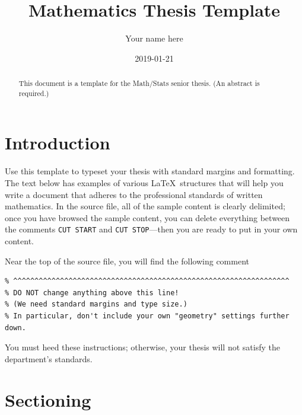 \documentclass[11pt]{amsart}
\title[Math Thesis Template]{Mathematics Thesis Template} %
\author{Your name here}
\date{2019-01-21} %
\theoremstyle{theorem} %
\theoremstyle{definition}                  %
\theoremstyle{example}                       %
\theoremstyle{remark}                       %
\numberwithin{equation}{section}
\begin{document}
\begin{abstract} %
This document is a template for the Math/Stats senior thesis. (An abstract is required.)
\end{abstract}

\maketitle %


\tableofcontents %

\section{Introduction}

Use this template to typeset your thesis with standard margins and formatting. The text below has examples of various \LaTeX\ structures that will help you write a 
document that adheres to the professional standards of written mathematics. 
In the source file, all of the sample content is clearly delimited; once you have browsed the sample content, you can delete everything between the comments \texttt{CUT START} and \texttt{CUT STOP}---then you are ready to put in your own content.

Near the top of the source file, you will find the following comment

\smallskip
\begin{verbatim}
% ^^^^^^^^^^^^^^^^^^^^^^^^^^^^^^^^^^^^^^^^^^^^^^^^^^^^^^^^^^^^^^^^^
% DO NOT change anything above this line! 
% (We need standard margins and type size.)
% In particular, don't include your own "geometry" settings further down.
\end{verbatim}
\smallskip

You must heed these instructions; otherwise, your thesis will not satisfy the department's standards.


\section{Sectioning}
\end{document}
